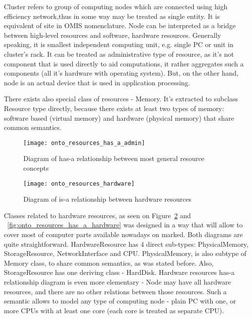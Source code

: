Cluster refers to group of computing nodes which are connected using high efficiency network,thus in some way may be
treated as single entity. It is equivalent of site in OMIS nomenclature\cite{tl9702e}. Node can be interpreted as a
bridge between high-level resources and software, hardware resources. Generally speaking, it is smallest independent
computing unit, e.g. single PC or unit in cluster's rack. It can be treated as administrative type of resource, as it's
not component that is used directly to aid computations, it rather aggregates such a components (all it's hardware with
operating system). But, on the other hand, node is an actual device that is used in application processing. 

There exists also special class of resources - Memory. It's extracted to subclass Resource type directly, because there
exists at least two types of memory: software based (virtual memory) and hardware (physical memory) that share
common semantics.

\begin{figure}[ht]
  \centering
  \texttt{[image: onto\_resources\_has\_a\_admin]}
  \caption{Diagram of has-a relationship between most general resource concepts}
  \label{fig:onto_resources_has_a_admin}
\end{figure}

\pagebreak


\begin{figure}[ht]
  \centering
  \texttt{[image: onto\_resources\_hardware]}
  \caption{Diagram of is-a relationship between hardware resources}
  \label{fig:onto_resources_hardware}
\end{figure}

Classes related to hardware resources, as seen on Figure~\ref{fig:onto_resources_hardware}
and ~\ref{fig:onto_resources_has_a_hardware} was designed in a way that will allow to cover most of computer parts
available nowadays on marked. Both diagrams are quite straightforward. HardwareResource has 4 direct sub-types:
PhysicalMemory, StorageResource, NetworkInterface and CPU. PhysicalMemory, is also subtype of Memory class, to share
common semantics, as was stated before. Also, StorageResource has one deriving class - HardDisk. 
Hardware resources has-a relationship diagram is even more elementary - Node may have all hardware resources, and there
are no other relations between those resources. Such a semantic allows to model any type of computing node - plain PC
with one, or more CPUs with at least one core (each core is treated as separate CPU).

